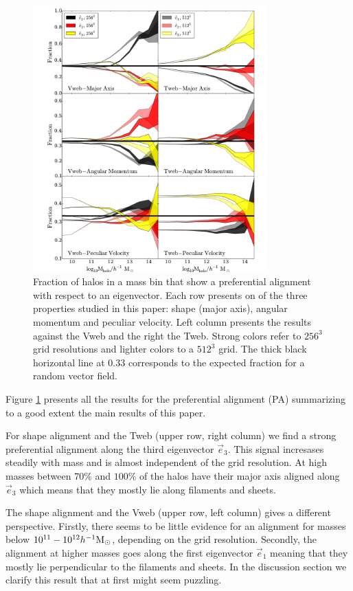 \documentclass[useAMS,usenatbib]{mn2e}
\newcommand{\hMsun}{{\ifmmode{h^{-1}{\rm
        {M_{\odot}}}}\else{$h^{-1}{\rm{M_{\odot}}}$~}\fi}}
\begin{document}
\begin{figure}
\includegraphics[width=0.8\textwidth]{Fig1.pdf}
\caption{Fraction of halos in a mass bin that show a preferential
  alignment with respect to an eigenvector. Each row presents on of
  the three properties studied in this paper: shape (major axis),
  angular momentum and  peculiar velocity. Left column presents the
  results against the Vweb   and the right the Tweb. Strong colors
  refer to $256^3$ grid resolutions and lighter colors to a $512^3$
  grid. The thick black horizontal line at $0.33$ corresponds to the
  expected fraction for a random vector field.
\label{fig:preferential}}
\end{figure}

Figure \ref{fig:preferential} presents all the results for the
preferential alignment (PA) summarizing to a good extent the main
results of this paper. 

For shape alignment and the Tweb (upper row, right column) we find a strong
preferential alignment along the third eigenvector $\vec{e}_{3}$. This
signal incresases steadily with mass and is almost independent of the
grid resolution. At high masses between $70\%$ and $100\%$ of the
halos have their major axis aligned along $\vec{e}_{3}$ which means
that they mostly lie along filaments and sheets. 

The shape alignment and the Vweb (upper row, left column) gives a
different perspective. Firstly, there seems to be little evidence
for an alignment for masses below $10^{11}-10^{12}\hMsun$, depending
on the grid resolution. Secondly, the alignment at higher masses goes
along the first eigenvector $\vec{e}_{1}$ meaning that they mostly lie
perpendicular to the filaments and sheets. In the discussion section
we clarify this result that at first might seem puzzling.
\end{document}
